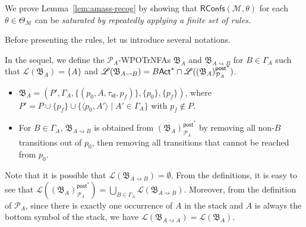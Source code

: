 \documentclass[preprint,12pt]{elsarticle}
\newcommand\Mm{{\mathcal{M} }}
\newcommand\Pp{{\mathcal{P} }}
\newcommand\act{{\sf Act}}
\newcommand\post{{\mathsf{post} }}
\newcommand\aname{\mathfrak{n}}
\newcommand\RConfs{\mathsf{RConfs}}
\newcommand\RLang{\mathsf{RRel}}
\newcommand{\id}{\mathsf{id}}
\newcommand\Aut{{\mathfrak{A} }}
\newcommand\AutB{{\mathfrak{B} }}
\newcommand\Lang{{\mathscr{L} }}
\newcommand{\WOTrNFA}{\textsf{WPOTrNFA}}
\begin{document}
    
    
We prove Lemma~\ref{lem:amass-recog} by showing that $\RConfs(\Mm, \theta)$ for each $\theta \in \Theta_\Mm$ can be \emph{saturated by repeatedly applying a finite set of rules}. 

Before presenting the rules, let us introduce several notations. 

In the sequel, we define the $\Pp_{A}$-{\WOTrNFA}s $\AutB_{A}$ and $\AutB_{A\rightsquigarrow B}$ for $B \in \Gamma_A$ such that $\Lang(\AutB_A) = \{A\}$ and $\Lang(\AutB_{A\rightsquigarrow B}) =B\act^* \cap \Lang((\AutB_{A})^{\post^*}_{\Pp_A})$. 
\begin{itemize}
    \item $\AutB_{A} = (P', \Gamma_A, \{(p_0, A,\tau_\id, p_f)\},\{p_0\},\{p_f\} )$, where $P' = P \cup \{p_f\} \cup \{\langle p_0,A'\rangle \mid A'\in\Gamma_A\}$ with $p_f \not \in P$.  
    \item For $B \in \Gamma_A$, $\AutB_{A\rightsquigarrow B}$ is obtained from $(\AutB_{A})^{\post^*}_{\Pp_A}$ by removing all non-$B$ transitions out of $p_0$, then removing all transitions that cannot be reached from $p_0$. 
\end{itemize}
Note that it is possible that $\Lang(\AutB_{A\rightsquigarrow B}) = \emptyset$.
From the definitions, it is easy to see that $\Lang((\AutB_A)^{\post^*}_{\Pp_A}) = \bigcup\limits_{B\in\Gamma_A} \Lang(\AutB_{A\rightsquigarrow B})$. Moreover, from the definition of $\Pp_A$, since there is exactly one occurrence of $A$ in the stack and $A$ is always the bottom symbol of the stack, we have $\Lang(\AutB_{A\rightsquigarrow A}) = \Lang(\AutB_A)$. 
\end{document}
